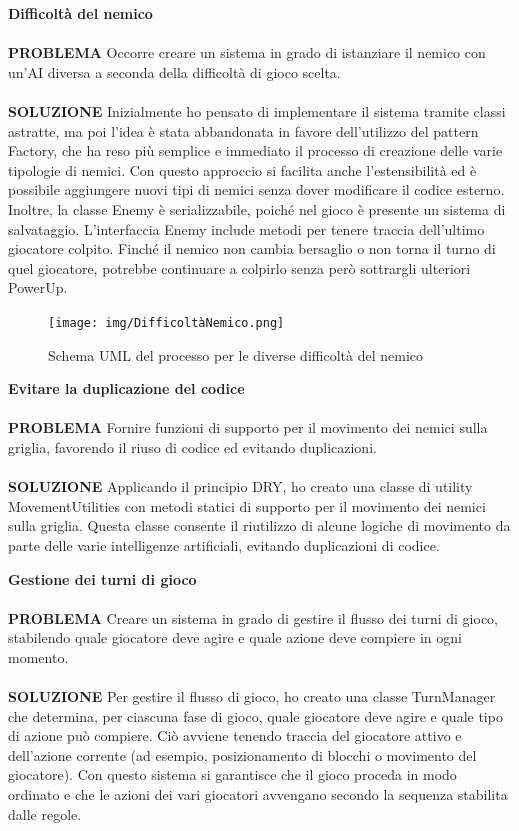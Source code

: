\documentclass[a4paper,12pt]{report}
\begin{document}
\textbf{Difficoltà del nemico}
\\
\\
\textbf{PROBLEMA}
Occorre creare un sistema in grado di istanziare il nemico con un’AI diversa a seconda della difficoltà di gioco scelta.
\\
\\
\textbf{SOLUZIONE}
Inizialmente ho pensato di implementare il sistema tramite classi astratte, ma poi l’idea è stata abbandonata in favore 
dell’utilizzo del pattern Factory, che ha reso più semplice e immediato il processo di creazione delle varie tipologie di nemici.
Con questo approccio si facilita anche l’estensibilità ed è possibile aggiungere nuovi tipi di nemici senza dover modificare 
il codice esterno. Inoltre, la classe Enemy è serializzabile, poiché nel gioco è presente un sistema di salvataggio.
L’interfaccia Enemy include metodi per tenere traccia dell’ultimo giocatore colpito. 
Finché il nemico non cambia bersaglio o non torna il turno di quel giocatore, 
potrebbe continuare a colpirlo senza però sottrargli ulteriori PowerUp.
\begin{figure}[H]
	\centering{}
	\texttt{[image: img/DifficoltàNemico.png]}
	\caption{Schema UML del processo per le diverse difficoltà del nemico}
	\label{img:Traduzione Informazioni}
\end{figure}
\textbf{Evitare la duplicazione del codice}
\\
\\
\textbf{PROBLEMA}
Fornire funzioni di supporto per il movimento dei nemici sulla griglia, favorendo il riuso di codice ed evitando duplicazioni.
\\
\\
\textbf{SOLUZIONE}
Applicando il principio DRY, ho creato una classe di utility MovementUtilities con metodi statici di supporto 
per il movimento dei nemici sulla griglia. Questa classe consente il riutilizzo di alcune logiche di movimento 
da parte delle varie intelligenze artificiali, evitando duplicazioni di codice.

\textbf{Gestione dei turni di gioco}
\\
\\
\textbf{PROBLEMA}
Creare un sistema in grado di gestire il flusso dei turni di gioco, stabilendo quale giocatore deve agire 
e quale azione deve compiere in ogni momento.
\\
\\
\textbf{SOLUZIONE}
Per gestire il flusso di gioco, ho creato una classe TurnManager che determina, per ciascuna fase di gioco, 
quale giocatore deve agire e quale tipo di azione può compiere. Ciò avviene tenendo traccia del giocatore attivo e 
dell’azione corrente (ad esempio, posizionamento di blocchi o movimento del giocatore).
Con questo sistema si garantisce che il gioco proceda in modo ordinato e che le azioni dei vari giocatori avvengano 
secondo la sequenza stabilita dalle regole.
\end{document}
